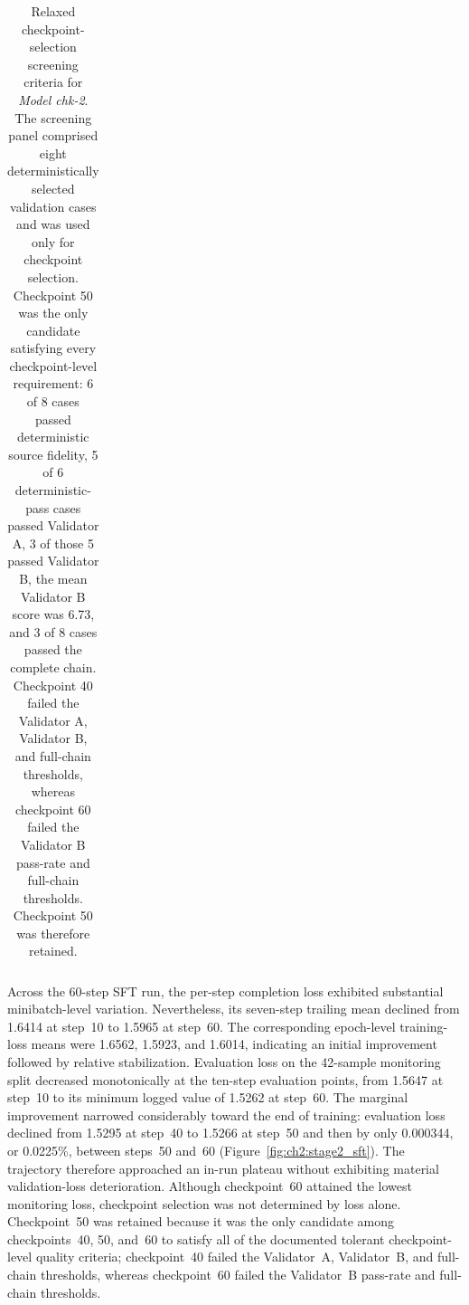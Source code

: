 \begin{table}[htbp]
\begin{tabularx}{\textwidth}{@{}
        >{\raggedright\arraybackslash}p{}
        >{\raggedright\arraybackslash}X
        >{\raggedright\arraybackslash}p{}
    @{}}
        \bottomrule
    \end{tabularx}

    \caption{Relaxed checkpoint-selection screening criteria for
    \textit{Model chk-2}. The screening panel comprised eight deterministically
    selected validation cases and was used only for checkpoint selection.
    Checkpoint 50 was the only candidate satisfying every checkpoint-level
    requirement: 6 of 8 cases passed deterministic source fidelity, 5 of 6
    deterministic-pass cases passed Validator A, 3 of those 5 passed Validator
    B, the mean Validator B score was 6.73, and 3 of 8 cases passed the complete
    chain. Checkpoint 40 failed the Validator A, Validator B, and full-chain
    thresholds, whereas checkpoint 60 failed the Validator B pass-rate and
    full-chain thresholds. Checkpoint 50 was therefore retained.}
    \label{tab:app:chk2_checkpoint_selection_gates}
\end{table}


Across the 60-step SFT run, the per-step completion loss exhibited substantial
minibatch-level variation. Nevertheless, its seven-step trailing mean declined
from 1.6414 at step~10 to 1.5965 at step~60. The corresponding epoch-level
training-loss means were 1.6562, 1.5923, and 1.6014, indicating an initial
improvement followed by relative stabilization. Evaluation loss on the
42-sample monitoring split decreased monotonically at the ten-step evaluation
points, from 1.5647 at step~10 to its minimum logged value of 1.5262 at
step~60. The marginal improvement narrowed considerably toward the end of
training: evaluation loss declined from 1.5295 at step~40 to 1.5266 at
step~50 and then by only 0.000344, or 0.0225\%, between steps~50 and~60
(Figure~\ref{fig:ch2:stage2_sft}). The trajectory therefore approached an
in-run plateau without exhibiting material validation-loss deterioration.
Although checkpoint~60 attained the lowest monitoring loss, checkpoint
selection was not determined by loss alone. Checkpoint~50 was retained because
it was the only candidate among checkpoints~40, 50, and~60 to satisfy all of
the documented tolerant checkpoint-level quality criteria; checkpoint~40
failed the Validator~A, Validator~B, and full-chain thresholds, whereas
checkpoint~60 failed the Validator~B pass-rate and full-chain thresholds.

